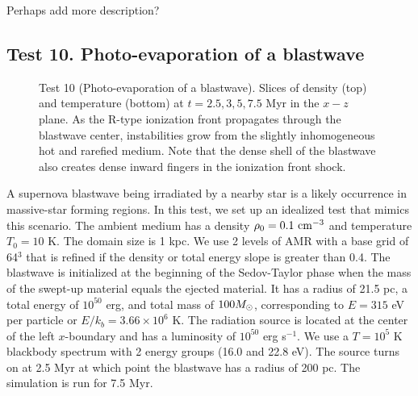 \documentclass[useAMS,usenatbib]{mn2e}
\begin{document}
\li Perhaps add more description?

\subsection{Test 10. Photo-evaporation of a blastwave}

\begin{figure*}
  \caption{\label{fig:test10} Test 10 (Photo-evaporation of a
    blastwave).  Slices of density (top) and temperature (bottom) at
    $t = 2.5, 3, 5, 7.5$ Myr in the $x-z$ plane.  As the R-type
    ionization front propagates through the blastwave center,
    instabilities grow from the slightly inhomogeneous hot and rarefied
    medium.  Note that the dense shell of the blastwave also creates
    dense inward fingers in the ionization front shock.}
\end{figure*}

A supernova blastwave being irradiated by a nearby star is a likely
occurrence in massive-star forming regions.  In this test, we set up an
idealized test that mimics this scenario.  The ambient medium has a
density $\rho_0 = 0.1~\cubecm$ and temperature $T_0 = 10$ K.  The
domain size is 1 kpc.  We use 2 levels of AMR with a base grid of
64$^3$ that is refined if the density or total energy slope is greater
than 0.4.  The blastwave is initialized at the beginning of the
Sedov-Taylor phase when the mass of the swept-up material equals the
ejected material.  It has a radius of 21.5 pc, a total energy of
$10^{50}$ erg, and total mass of $100 \Ms$, corresponding to $E = 315$
eV per particle or $E/k_b = 3.66 \times 10^6$ K.  The radiation source
is located at the center of the left $x$-boundary and has a luminosity
of $10^{50}$ erg s$^{-1}$.  We use a $T=10^5$ K blackbody spectrum
with 2 energy groups (16.0 and 22.8 eV).  The source turns on at 2.5
Myr at which point the blastwave has a radius of 200 pc.  The
simulation is run for 7.5 Myr.
\end{document}
